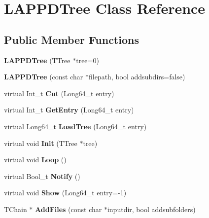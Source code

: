 \hypertarget{classLAPPDTree}{\section{L\-A\-P\-P\-D\-Tree Class Reference}
\label{classLAPPDTree}
}
\subsection*{Public Member Functions}
\begin{DoxyCompactItemize}
\item 
\hypertarget{classLAPPDTree_abb24c0d515c12bc1809d5d0bf7c6abc6}{{\bfseries L\-A\-P\-P\-D\-Tree} (T\-Tree $\ast$tree=0)}\label{classLAPPDTree_abb24c0d515c12bc1809d5d0bf7c6abc6}

\item 
\hypertarget{classLAPPDTree_a64600503669b4b3d36763db323ef56f3}{{\bfseries L\-A\-P\-P\-D\-Tree} (const char $\ast$filepath, bool addsubdirs=false)}\label{classLAPPDTree_a64600503669b4b3d36763db323ef56f3}

\item 
\hypertarget{classLAPPDTree_a6de6bc7aa0dbf3bb246fbaae06723244}{virtual Int\-\_\-t {\bfseries Cut} (Long64\-\_\-t entry)}\label{classLAPPDTree_a6de6bc7aa0dbf3bb246fbaae06723244}

\item 
\hypertarget{classLAPPDTree_a0ae74d3f6b190e015bc109d039f4f9a8}{virtual Int\-\_\-t {\bfseries Get\-Entry} (Long64\-\_\-t entry)}\label{classLAPPDTree_a0ae74d3f6b190e015bc109d039f4f9a8}

\item 
\hypertarget{classLAPPDTree_a9047fa387962f63c3da57a5fe9dd31e1}{virtual Long64\-\_\-t {\bfseries Load\-Tree} (Long64\-\_\-t entry)}\label{classLAPPDTree_a9047fa387962f63c3da57a5fe9dd31e1}

\item 
\hypertarget{classLAPPDTree_a347e8109500ef62ace4bbc0d89890918}{virtual void {\bfseries Init} (T\-Tree $\ast$tree)}\label{classLAPPDTree_a347e8109500ef62ace4bbc0d89890918}

\item 
\hypertarget{classLAPPDTree_ad16b2af53b7d2ab9a2f63514cd0de6b4}{virtual void {\bfseries Loop} ()}\label{classLAPPDTree_ad16b2af53b7d2ab9a2f63514cd0de6b4}

\item 
\hypertarget{classLAPPDTree_a404d7028c21e7c2e0c6339b917c3ca67}{virtual Bool\-\_\-t {\bfseries Notify} ()}\label{classLAPPDTree_a404d7028c21e7c2e0c6339b917c3ca67}

\item 
\hypertarget{classLAPPDTree_a7d7520170ee101a91a5003e09b55c9a6}{virtual void {\bfseries Show} (Long64\-\_\-t entry=-\/1)}\label{classLAPPDTree_a7d7520170ee101a91a5003e09b55c9a6}

\item 
\hypertarget{classLAPPDTree_aa2436cb85efeec18ff4e05c9fda41359}{T\-Chain $\ast$ {\bfseries Add\-Files} (const char $\ast$inputdir, bool addsubfolders)}\label{classLAPPDTree_aa2436cb85efeec18ff4e05c9fda41359}

\end{DoxyCompactItemize}

